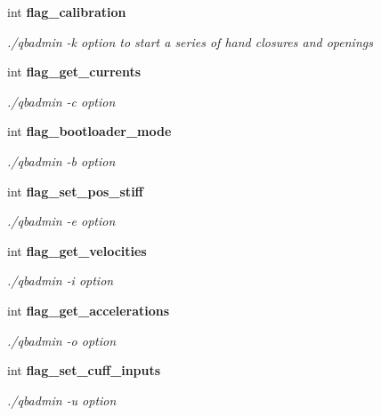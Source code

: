\begin{DoxyCompactItemize}
\mbox{\label{structglobal__args_ada343d7375a97b92b74f21ff14998520}} 
int \textbf{ flag\+\_\+calibration}
\begin{DoxyCompactList}\small\item\em ./qbadmin -\/k option to start a series of hand closures and openings \end{DoxyCompactList}\item 
\mbox{\label{structglobal__args_a884582f66057291a6a1f030d5d46d9d5}} 
int \textbf{ flag\+\_\+get\+\_\+currents}
\begin{DoxyCompactList}\small\item\em ./qbadmin -\/c option \end{DoxyCompactList}\item 
\mbox{\label{structglobal__args_a8488439bc3473b5fb08964d06b51b80a}} 
int \textbf{ flag\+\_\+bootloader\+\_\+mode}
\begin{DoxyCompactList}\small\item\em ./qbadmin -\/b option \end{DoxyCompactList}\item 
\mbox{\label{structglobal__args_ac814e1ddd60d50ef7e0aeac6a5ea38b0}} 
int \textbf{ flag\+\_\+set\+\_\+pos\+\_\+stiff}
\begin{DoxyCompactList}\small\item\em ./qbadmin -\/e option \end{DoxyCompactList}\item 
\mbox{\label{structglobal__args_aa9b8d91302ac6dbb99023c9363c352f8}} 
int \textbf{ flag\+\_\+get\+\_\+velocities}
\begin{DoxyCompactList}\small\item\em ./qbadmin -\/i option \end{DoxyCompactList}\item 
\mbox{\label{structglobal__args_af72013af180143fd3cce334fca450bec}} 
int \textbf{ flag\+\_\+get\+\_\+accelerations}
\begin{DoxyCompactList}\small\item\em ./qbadmin -\/o option \end{DoxyCompactList}\item 
\mbox{\label{structglobal__args_a8bae74d00a58818ba0dad8bc3fb46625}} 
int \textbf{ flag\+\_\+set\+\_\+cuff\+\_\+inputs}
\begin{DoxyCompactList}\small\item\em ./qbadmin -\/u option \end{DoxyCompactList}\item 
\mbox{\label{structglobal__args_aeb7e77450221e7de1da5ae0701a8c7af}} 

\end{DoxyCompactItemize}
